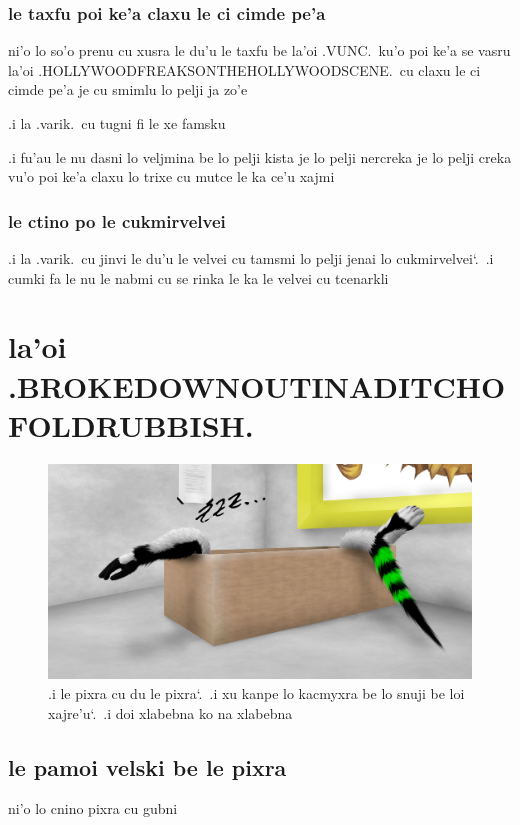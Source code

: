 \documentclass{report}
\newcommand\sds{\spacefactor\sfcode`.\ \space}
\begin{document}
\subsection{le taxfu poi ke'a claxu le ci cimde pe'a}
ni'o lo so'o prenu cu xusra le du'u le taxfu be la'oi .VUNC.\ ku'o poi ke'a se vasru la'oi .HOLLYWOODFREAKSONTHEHOLLYWOODSCENE.\ cu claxu le ci cimde pe'a je cu smimlu lo pelji ja zo'e

.i la .varik.\ cu tugni fi le xe famsku

.i fu'au le nu dasni lo veljmina be lo pelji kista je lo pelji nercreka je lo pelji creka vu'o poi ke'a claxu lo trixe cu mutce le ka ce'u xajmi

\subsection{le ctino po le cukmirvelvei}
.i la .varik.\ cu jinvi le du'u le velvei cu tamsmi lo pelji jenai lo cukmirvelvei\sds  .i cumki fa le nu le nabmi cu se rinka le ka le velvei cu tcenarkli

\chapter{la'oi .BROKEDOWNOUTINADITCHOFOLDRUBBISH.}
\begin{figure}[ht]
	\centering
	\includegraphics[width=\textwidth]{brokedownoutinaditchofoldrubbish/brokedownoutinaditchofoldrubbish.png}
	\caption[center]{.i le pixra cu du le pixra\sds  .i xu kanpe lo kacmyxra be lo snuji be loi xajre'u\sds  .i doi xlabebna ko na xlabebna}
\end{figure}
\section{le pamoi velski be le pixra}
ni'o lo cnino pixra cu gubni
\end{document}
